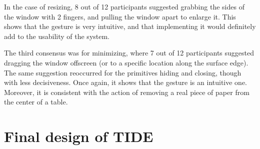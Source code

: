 In the case of resizing, 8 out of 12 participants suggested grabbing the sides of the window with 2 fingers, and pulling the window apart to enlarge it.
This shows that the gesture is very intuitive, and that implementing it would definitely add to the usability of the system.

The third consensus was for minimizing, where 7 out of 12 participants suggested dragging the window offscreen (or to a specific location along the surface edge).
The same suggestion reoccurred for the primitives hiding and closing, though with less decisiveness.
Once again, it shows that the gesture is an intuitive one.
Moreover, it is consistent with the action of removing a real piece of paper from the center of a table.

\clearpage
\section{Final design of TIDE}
\label{sec:design}

